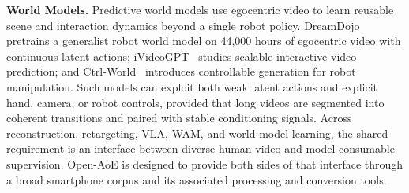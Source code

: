 \textbf{World Models.}
Predictive world models use egocentric video to learn reusable scene and interaction dynamics beyond a single robot policy. DreamDojo~\cite{dreamdojo2026} pretrains a generalist robot world model on 44,000 hours of egocentric video with continuous latent actions; iVideoGPT~\cite{ivideogpt2024} studies scalable interactive video prediction; and Ctrl-World~\cite{ctrlworld2025} introduces controllable generation for robot manipulation. Such models can exploit both weak latent actions and explicit hand, camera, or robot controls, provided that long videos are segmented into coherent transitions and paired with stable conditioning signals. Across reconstruction, retargeting, VLA, WAM, and world-model learning, the shared requirement is an interface between diverse human video and model-consumable supervision. Open-AoE is designed to provide both sides of that interface through a broad smartphone corpus and its associated processing and conversion tools.
